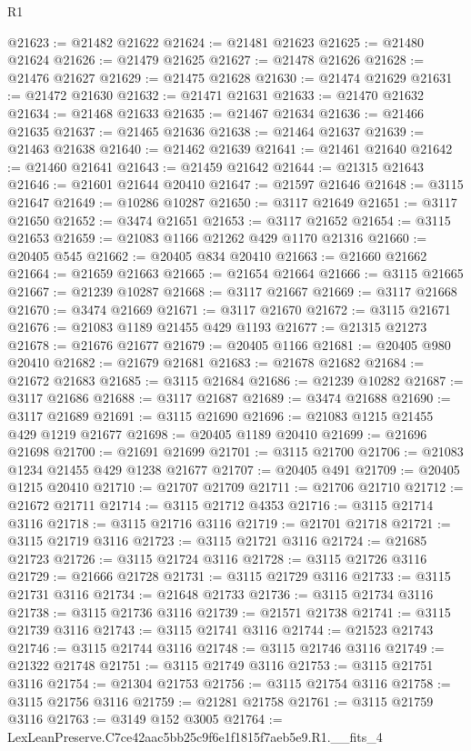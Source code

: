 \begin{lexlean}{R1}
\begin{coremodule}
@21623 := @21482 @21622
@21624 := @21481 @21623
@21625 := @21480 @21624
@21626 := @21479 @21625
@21627 := @21478 @21626
@21628 := @21476 @21627
@21629 := @21475 @21628
@21630 := @21474 @21629
@21631 := @21472 @21630
@21632 := @21471 @21631
@21633 := @21470 @21632
@21634 := @21468 @21633
@21635 := @21467 @21634
@21636 := @21466 @21635
@21637 := @21465 @21636
@21638 := @21464 @21637
@21639 := @21463 @21638
@21640 := @21462 @21639
@21641 := @21461 @21640
@21642 := @21460 @21641
@21643 := @21459 @21642
@21644 := @21315 @21643
@21646 := @21601 @21644 @20410
@21647 := @21597 @21646
@21648 := @3115 @21647
@21649 := @10286 @10287
@21650 := @3117 @21649
@21651 := @3117 @21650
@21652 := @3474 @21651
@21653 := @3117 @21652
@21654 := @3115 @21653
@21659 := @21083 @1166 @21262 @429 @1170 @21316
@21660 := @20405 @545
@21662 := @20405 @834 @20410
@21663 := @21660 @21662
@21664 := @21659 @21663
@21665 := @21654 @21664
@21666 := @3115 @21665
@21667 := @21239 @10287
@21668 := @3117 @21667
@21669 := @3117 @21668
@21670 := @3474 @21669
@21671 := @3117 @21670
@21672 := @3115 @21671
@21676 := @21083 @1189 @21455 @429 @1193
@21677 := @21315 @21273
@21678 := @21676 @21677
@21679 := @20405 @1166
@21681 := @20405 @980 @20410
@21682 := @21679 @21681
@21683 := @21678 @21682
@21684 := @21672 @21683
@21685 := @3115 @21684
@21686 := @21239 @10282
@21687 := @3117 @21686
@21688 := @3117 @21687
@21689 := @3474 @21688
@21690 := @3117 @21689
@21691 := @3115 @21690
@21696 := @21083 @1215 @21455 @429 @1219 @21677
@21698 := @20405 @1189 @20410
@21699 := @21696 @21698
@21700 := @21691 @21699
@21701 := @3115 @21700
@21706 := @21083 @1234 @21455 @429 @1238 @21677
@21707 := @20405 @491
@21709 := @20405 @1215 @20410
@21710 := @21707 @21709
@21711 := @21706 @21710
@21712 := @21672 @21711
@21714 := @3115 @21712 @4353
@21716 := @3115 @21714 @3116
@21718 := @3115 @21716 @3116
@21719 := @21701 @21718
@21721 := @3115 @21719 @3116
@21723 := @3115 @21721 @3116
@21724 := @21685 @21723
@21726 := @3115 @21724 @3116
@21728 := @3115 @21726 @3116
@21729 := @21666 @21728
@21731 := @3115 @21729 @3116
@21733 := @3115 @21731 @3116
@21734 := @21648 @21733
@21736 := @3115 @21734 @3116
@21738 := @3115 @21736 @3116
@21739 := @21571 @21738
@21741 := @3115 @21739 @3116
@21743 := @3115 @21741 @3116
@21744 := @21523 @21743
@21746 := @3115 @21744 @3116
@21748 := @3115 @21746 @3116
@21749 := @21322 @21748
@21751 := @3115 @21749 @3116
@21753 := @3115 @21751 @3116
@21754 := @21304 @21753
@21756 := @3115 @21754 @3116
@21758 := @3115 @21756 @3116
@21759 := @21281 @21758
@21761 := @3115 @21759 @3116
@21763 := @3149 @152 @3005
@21764 := LexLeanPreserve.C7ce42aac5bb25c9f6e1f1815f7aeb5e9.R1.__fits_4

\end{coremodule}
\end{lexlean}
